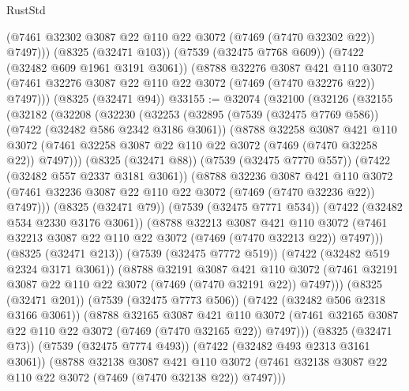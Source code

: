 \begin{lexlean}{RustStd}
\begin{coremodule}
          (@7461 @32302 @3087 @22 @110 @22 @3072 (@7469 (@7470 @32302 @22)) @7497)))
      (@8325 (@32471 @103))
      (@7539 (@32475 @7768 @609))
      (@7422 (@32482 @609 @1961 @3191 @3061))
      (@8788
        @32276
        @3087
        @421
        @110
        @3072
        (@7461 @32276 @3087 @22 @110 @22 @3072 (@7469 (@7470 @32276 @22)) @7497)))
    (@8325 (@32471 @94))
@33155 := @32074
    (@32100
      (@32126
        (@32155
          (@32182
            (@32208
              (@32230
                (@32253
                  (@32895
                    (@7539 (@32475 @7769 @586))
                    (@7422 (@32482 @586 @2342 @3186 @3061))
                    (@8788
                      @32258
                      @3087
                      @421
                      @110
                      @3072
                      (@7461 @32258 @3087 @22 @110 @22 @3072 (@7469 (@7470 @32258 @22)) @7497)))
                  (@8325 (@32471 @88))
                  (@7539 (@32475 @7770 @557))
                  (@7422 (@32482 @557 @2337 @3181 @3061))
                  (@8788
                    @32236
                    @3087
                    @421
                    @110
                    @3072
                    (@7461 @32236 @3087 @22 @110 @22 @3072 (@7469 (@7470 @32236 @22)) @7497)))
                (@8325 (@32471 @79))
                (@7539 (@32475 @7771 @534))
                (@7422 (@32482 @534 @2330 @3176 @3061))
                (@8788
                  @32213
                  @3087
                  @421
                  @110
                  @3072
                  (@7461 @32213 @3087 @22 @110 @22 @3072 (@7469 (@7470 @32213 @22)) @7497)))
              (@8325 (@32471 @213))
              (@7539 (@32475 @7772 @519))
              (@7422 (@32482 @519 @2324 @3171 @3061))
              (@8788
                @32191
                @3087
                @421
                @110
                @3072
                (@7461 @32191 @3087 @22 @110 @22 @3072 (@7469 (@7470 @32191 @22)) @7497)))
            (@8325 (@32471 @201))
            (@7539 (@32475 @7773 @506))
            (@7422 (@32482 @506 @2318 @3166 @3061))
            (@8788
              @32165
              @3087
              @421
              @110
              @3072
              (@7461 @32165 @3087 @22 @110 @22 @3072 (@7469 (@7470 @32165 @22)) @7497)))
          (@8325 (@32471 @73))
          (@7539 (@32475 @7774 @493))
          (@7422 (@32482 @493 @2313 @3161 @3061))
          (@8788
            @32138
            @3087
            @421
            @110
            @3072
            (@7461 @32138 @3087 @22 @110 @22 @3072 (@7469 (@7470 @32138 @22)) @7497)))

\end{coremodule}
\end{lexlean}
